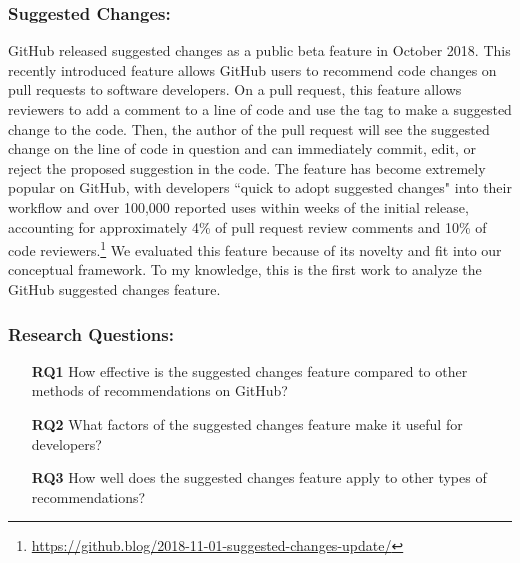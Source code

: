 \subsubsection{Suggested Changes:} GitHub released suggested changes as a public beta feature in October 2018. This recently introduced feature allows GitHub users to recommend code changes on pull requests to software developers. On a pull request, this feature allows reviewers to add a comment to a line of code and use the \suggtag tag to make a suggested change to the code. Then, the author of the pull request will see the suggested change on the line of code in question and can immediately commit, edit, or reject the proposed suggestion in the code. The feature has become extremely popular on GitHub, with developers ``quick to adopt suggested changes" into their workflow and over 100,000 reported uses within weeks of the initial release, accounting for approximately 4\% of pull request review comments and 10\% of code reviewers.\footnote{\label{SuggestBlog}\url{https://github.blog/2018-11-01-suggested-changes-update/}} We evaluated this feature because of its novelty and fit into our conceptual framework. To my knowledge, this is the first work to analyze the GitHub suggested changes feature.

\subsubsection{Research Questions:}

\begin{itemize}
    \item[\textbf{RQ1}] How effective is the suggested changes feature compared to other methods of recommendations on GitHub?
    \item[\textbf{RQ2}] What factors of the suggested changes feature make it useful for developers?
    \item[\textbf{RQ3}] How well does the suggested changes feature apply to other types of recommendations?
\end{itemize}


